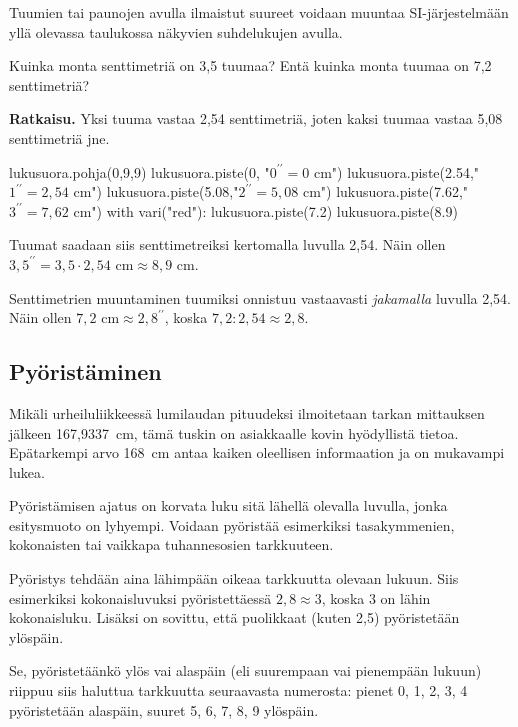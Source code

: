 Tuumien tai paunojen avulla ilmaistut suureet voidaan muuntaa SI-järjestelmään yllä olevassa taulukossa
näkyvien suhdelukujen avulla.

\begin{esimerkki}
Kuinka monta senttimetriä on 3,5 tuumaa? Entä kuinka monta tuumaa on 7,2 senttimetriä?

\textbf{Ratkaisu. } Yksi tuuma vastaa 2,54 senttimetriä, joten kaksi tuumaa vastaa 5,08 senttimetriä jne.

\begin{kuva}
	lukusuora.pohja(0,9,9)
	lukusuora.piste(0, "$0^{\prime \prime} = 0 $ cm")
	lukusuora.piste(2.54,"$1^{\prime \prime} = 2,54$ cm")
	lukusuora.piste(5.08,"$2^{\prime \prime} = 5,08$ cm")
	lukusuora.piste(7.62,"$3^{\prime \prime} = 7,62$ cm")
	with vari("red"):
	  lukusuora.piste(7.2)
	  lukusuora.piste(8.9)
\end{kuva}

Tuumat saadaan siis senttimetreiksi kertomalla luvulla 2,54. Näin ollen $3,5^{\prime \prime} = 3,5 \cdot 2,54 \textrm{ cm} \approx 8,9 \textrm{ cm}$.

Senttimetrien muuntaminen tuumiksi onnistuu vastaavasti \emph{jakamalla} luvulla 2,54.
Näin ollen $7,2 \textrm{ cm} \approx 2,8^{\prime \prime}$, koska $7,2 : 2,54 \approx 2,8$.

\end{esimerkki}

\subsection*{Pyöristäminen}

Mikäli urheiluliikkeessä lumilaudan pituudeksi ilmoitetaan tarkan mittauksen jälkeen 167,9337~cm, tämä tuskin on asiakkaalle kovin hyödyllistä tietoa. Epätarkempi arvo 168~cm antaa kaiken oleellisen informaation ja on mukavampi lukea.

Pyöristämisen ajatus on korvata luku sitä lähellä olevalla luvulla, jonka esitysmuoto on lyhyempi. Voidaan pyöristää
esimerkiksi tasakymmenien, kokonaisten tai vaikkapa tuhannesosien
tarkkuuteen.

Pyöristys tehdään aina lähimpään oikeaa tarkkuutta olevaan lukuun. Siis esimerkiksi kokonaisluvuksi pyöristettäessä $2,8 \approx 3$, koska 3 on lähin kokonaisluku. Lisäksi on sovittu, että
puolikkaat (kuten 2,5) pyöristetään ylöspäin.

Se, pyöristetäänkö ylös vai alaspäin (eli suurempaan vai
pienempään lukuun) riippuu siis haluttua tarkkuutta
seuraavasta numerosta: pienet
0, 1, 2, 3, 4 pyöristetään alaspäin, suuret 5, 6, 7, 8, 9 ylöspäin.

